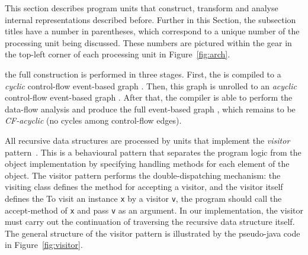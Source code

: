 This section describes program units that construct, transform and analyse internal representations described before. %
Further in this Section, the subsection titles have a number in parentheses, which correspond to a unique number of the  processing unit being discussed.
These numbers are pictured within the gear in the top-left corner of each processing unit in Figure~\ref{fig:arch}.

the full \xgraph{} construction is performed in three stages.
First, the \ytree{} is compiled to a \textit{cyclic} control-flow event-based graph \xgraph[CF].
Then, this graph is unrolled to an \textit{acyclic} control-flow event-based graph \xgraphU[CF].
After that, the compiler is able to perform the data-flow analysis and produce the full event-based graph \xgraphU[CF+DF], which remains to be \textit{CF-acyclic} (no cycles among control-flow edges).



All recursive data structures are processed by units that implement the \textit{visitor} pattern~\cite{palsberg1998essence}.
This is a behavioural pattern that separates the program logic from the object implementation by specifying handling methods for each element of the object.
The visitor pattern performs the double-dispatching mechanism: the visiting class defines the method for accepting a visitor, and the visitor itself defines the 
To visit an instance \lstinline{x} by a visitor \lstinline{v}, the program should call the accept-method of \lstinline{x} and pass \lstinline{v} as an argument.
In our implementation, the visitor must carry out the continuation of traversing the recursive data structure itself.
The general structure of the visitor pattern is illustrated by the pseudo-java code in Figure~\ref{fig:visitor}.


